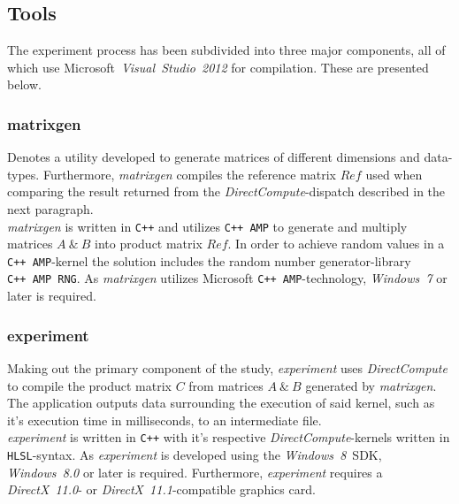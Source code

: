 \subsection{Tools}
\label{sec:contribution:tools}
The experiment process has been subdivided into three major components, all of which use Microsoft~\textit{Visual~Studio~2012} for compilation.
These are presented below.

\subsubsection{matrixgen}
Denotes a utility developed to generate matrices of different dimensions and data-types.
Furthermore, \textit{matrixgen} compiles the reference matrix $Ref$ used when comparing the result returned from the \textit{DirectCompute}-dispatch described in the next paragraph.\\
\textit{matrixgen} is written in \texttt{C++} and utilizes \texttt{C++~AMP} to generate and multiply matrices $A~\&~B$ into product matrix $Ref$.
In order to achieve random values in a \texttt{C++~AMP}-kernel the solution includes the random number generator-library \texttt{C++~AMP~RNG}.
As \textit{matrixgen} utilizes Microsoft \texttt{C++~AMP}-technology, \textit{Windows~7} or later is required.

\subsubsection{experiment}
Making out the primary component of the study, \textit{experiment} uses \textit{DirectCompute} to compile the product matrix $C$ from matrices $A~\&~B$ generated by \textit{matrixgen}.
The application outputs data surrounding the execution of said kernel, such as it's execution time in milliseconds, to an intermediate file.\\
\textit{experiment} is written in \texttt{C++} with it's respective \textit{DirectCompute}-kernels written in \texttt{HLSL}-syntax.
As \textit{experiment} is developed using the \textit{Windows~8}~SDK, \textit{Windows~8.0} or later is required.
Furthermore, \textit{experiment} requires a \textit{DirectX~11.0}- or \textit{DirectX~11.1}-compatible graphics card.

